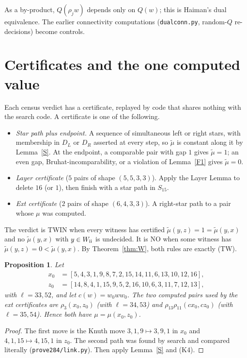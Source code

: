 \documentclass[11pt]{amsart}
\newcommand{\tmu}{\tilde\mu}
\theoremstyle{plain}
\newtheorem{proposition}[theorem]{Proposition}
\theoremstyle{definition}
\begin{document}
As a by-product, $Q(\rho_jw)$ depends only on $Q(w)$; this is Haiman's dual equivalence. The earlier connectivity computations (\texttt{dualconn.py}, random-$Q$ re-decisions) become controls.

\section{Certificates and the one computed value}

Each census verdict has a certificate, replayed by code that shares nothing with the search code. A certificate is one of the following.
\begin{itemize}[leftmargin=*,itemsep=0pt]
\item \emph{Star path plus endpoint.} A sequence of simultaneous left or right stars, with membership in $D_L$ or $D_R$ asserted at every step, so $\tmu$ is constant along it by Lemma~\ref{S}. At the endpoint, a comparable pair with gap $1$ gives $\tmu=1$; an even gap, Bruhat-incomparability, or a violation of Lemma~\ref{F1} gives $\tmu=0$.
\item \emph{Layer certificate} ($5$ pairs of shape $(5,5,3,3)$). Apply the Layer Lemma to delete $16$ (or $1$), then finish with a star path in $S_{15}$.
\item \emph{Ext certificate} ($2$ pairs of shape $(6,4,3,3)$). A right-star path to a pair whose $\mu$ was computed.
\end{itemize}
The verdict is TWIN when every witness has certified $\tmu(y,z)=1=\tmu(y,x)$ and no $\tmu(y,x)$ with $y\in W_{\rm ii}$ is undecided. It is NO when some witness has $\tmu(y,z)=0<\tmu(y,x)$. By Theorem~\ref{thm:W}, both rules are exactly (TW).

\begin{proposition}\label{prop:M}
Let
\begin{align*}x_0&=[5,4,3,1,9,8,7,2,15,14,11,6,13,10,12,16],\\ z_0&=[14,8,4,1,15,9,5,2,16,10,6,3,11,7,12,13],\end{align*}
with $\ell=33,52$, and let $c(w)=w_0ww_0$. The two computed pairs used by the ext certificates are $\rho_3(x_0,z_0)$ (with $\ell=34,53$) and $\rho_{13}\rho_{11}(cx_0,cz_0)$ (with $\ell=35,54$). Hence both have $\mu=\mu(x_0,z_0)$.
\end{proposition}
\begin{proof}
The first move is the Knuth move $3,1,9\mapsto3,9,1$ in $x_0$ and $4,1,15\mapsto4,15,1$ in $z_0$. The second path was found by search and compared literally (\texttt{prove284/link.py}). Then apply Lemma~\ref{S} and (K4).
\end{proof}
\end{document}
